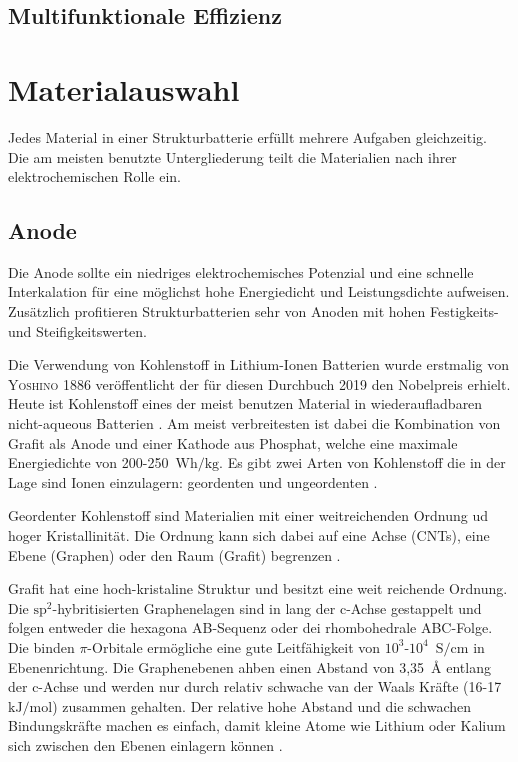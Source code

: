 \subsection{Multifunktionale Effizienz}

\section{Materialauswahl}

Jedes  Material in einer Strukturbatterie erfüllt mehrere Aufgaben gleichzeitig. Die am meisten benutzte Untergliederung teilt die Materialien nach ihrer elektrochemischen Rolle ein.


\subsection{Anode}
Die Anode sollte ein niedriges elektrochemisches Potenzial und eine schnelle Interkalation für eine möglichst hohe Energiedicht und Leistungsdichte aufweisen. Zusätzlich profitieren Strukturbatterien sehr von Anoden mit hohen Festigkeits- und Steifigkeitswerten.

Die Verwendung von Kohlenstoff in Lithium-Ionen Batterien wurde erstmalig von \textsc{Yoshino} \cite{Yoshino1986} 1886 veröffentlicht der für diesen Durchbuch 2019 den Nobelpreis erhielt.
Heute ist Kohlenstoff eines der meist benutzen Material in wiederaufladbaren nicht-aqueous Batterien \cite{Ahmad2021}. Am meist verbreitesten ist dabei die Kombination von Grafit als Anode und einer Kathode aus Phosphat, welche eine maximale Energiedichte von 200-250~$\si{\watt \hour \per \kg}$. 
Es gibt zwei Arten von Kohlenstoff die in der Lage sind Ionen einzulagern: geordenten und ungeordenten \cite{Ghosh2024}.

Geordenter Kohlenstoff sind Materialien mit einer weitreichenden Ordnung ud hoger Kristallinität. Die Ordnung kann sich dabei auf eine Achse (CNTs), eine Ebene (Graphen) oder den Raum (Grafit) begrenzen \cite{Wang2021}.

Grafit hat eine hoch-kristaline Struktur und besitzt eine weit reichende Ordnung. Die $\text{sp}^\text{2}$-hybritisierten Graphenelagen sind in lang der c-Achse gestappelt und folgen entweder die hexagona AB-Sequenz oder dei rhombohedrale ABC-Folge. Die binden $\pi$-Orbitale ermögliche eine gute Leitfähigkeit von $10^3$-$10^4$~$\si{\siemens \per \cm}$ in Ebenenrichtung. Die Graphenebenen ahben einen Abstand von 3,35~$\si{\angstrom}$ entlang der c-Achse und werden nur durch relativ schwache van der Waals Kräfte (16-17~$\si{\kJ \per \mol}$) zusammen gehalten. Der relative hohe Abstand und die schwachen Bindungskräfte machen es einfach, damit kleine Atome wie Lithium oder Kalium sich zwischen den Ebenen einlagern können \cite{Wang2021}.


